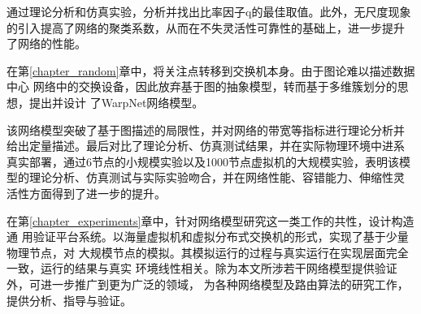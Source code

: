 \documentclass[bachelor,adobefonts]{jnuthesis} %
\begin{document}
    通过理论分析和仿真实验，分析并找出比率因子q的最佳取值。此外，无尺度现象
    的引入提高了网络的聚类系数，从而在不失灵活性可靠性的基础上，进一步提升
    了网络的性能。
    
    在第\ref{chapter_random}章中，将关注点转移到交换机本身。由于图论难以描述数据中心
    网络中的交换设备，因此放弃基于图的抽象模型，转而基于多维簇划分的思想，提出并设计
    了WarpNet网络模型。
    
    该网络模型突破了基于图描述的局限性，并对网络的带宽等指标进行理论分析并
    给出定量描述。最后对比了理论分析、仿真测试结果，并在实际物理环境中进系
    真实部署，通过6节点的小规模实验以及1000节点虚拟机的大规模实验，表明该模
    型的理论分析、仿真测试与实际实验吻合，并在网络性能、容错能力、伸缩性灵
    活性方面得到了进一步的提升。
    
    在第\ref{chapter_experiments}章中，针对网络模型研究这一类工作的共性，设计构造通
    用验证平台系统。以海量虚拟机和虚拟分布式交换机的形式，实现了基于少量物理节点，对
    大规模节点的模拟。其模拟运行的过程与真实运行在实现层面完全一致，运行的结果与真实
    环境线性相关。除为本文所涉若干网络模型提供验证外，可进一步推广到更为广泛的领域，
    为各种网络模型及路由算法的研究工作，提供分析、指导与验证。
    
    
\end{document}
